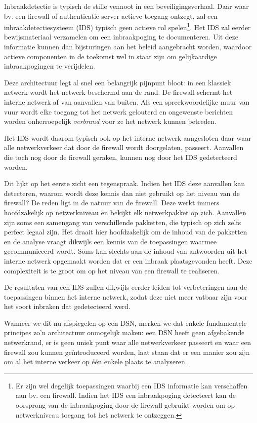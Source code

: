 Inbraakdetectie is typisch de stille vennoot in een beveiligingsverhaal. Daar
waar bv. een firewall of authenticatie server actieve toegang ontzegt, zal een
inbraakdetectiesysteem (IDS) typisch geen actieve rol spelen\footnote{Er zijn
wel degelijk toepassingen waarbij een IDS informatie kan verschaffen aan bv.
een firewall. Indien het IDS een inbraakpoging detecteert kan de oorsprong van
de inbraakpoging door de firewall gebruikt worden om op netwerkniveau toegang
tot het netwerk te ontzeggen.}. Het IDS zal eerder bewijsmateriaal verzamelen
om een inbraakpoging te documenteren. Uit deze informatie kunnen dan
bijsturingen aan het beleid aangebracht worden, waardoor actieve componenten in
de toekomst wel in staat zijn om gelijkaardige inbraakpogingen te verijdelen.

Deze architectuur legt al snel een belangrijk pijnpunt bloot: in een klassiek
netwerk wordt het netwerk beschermd aan de rand. De firewall schermt het
interne netwerk af van aanvallen van buiten. Als een spreekwoordelijke muur van
vuur wordt elke toegang tot het netwerk gelouterd en ongewenste berichten
worden onherroepelijk \emph{verbrand} voor ze het netwerk kunnen betreden.

Het IDS wordt daarom typisch ook op het interne netwerk aangesloten daar waar
alle netwerkverkeer dat door de firewall wordt doorgelaten, passeert. Aanvallen
die toch nog door de firewall geraken, kunnen nog door het IDS gedetecteerd
worden.

Dit lijkt op het eerste zicht een tegenspraak. Indien het IDS deze aanvallen
kan detecteren, waarom wordt deze kennis dan niet gebruikt op het niveau van de
firewall? De reden ligt in de natuur van de firewall. Deze werkt immers
hoofdzakelijk op netwerkniveau en bekijkt elk netwerkpakket op zich. Aanvallen
zijn soms een samengang van verschillende pakketten, die typisch op zich zelfs
perfect legaal zijn. Het draait hier hoofdzakelijk om de inhoud van de
pakketten en de analyse vraagt dikwijls een kennis van de toepassingen waarmee
gecommuniceerd wordt. Soms kan slechts aan de inhoud van antwoorden uit het
interne netwerk opgemaakt worden dat er een inbraak plaatsgevonden heeft. Deze
complexiteit is te groot om op het niveau van een firewall te realiseren.

De resultaten van een IDS zullen dikwijls eerder leiden tot verbeteringen aan
de toepassingen binnen het interne netwerk, zodat deze niet meer vatbaar zijn
voor het soort inbraken dat gedetecteerd werd.

Wanneer we dit nu afspiegelen op een DSN, merken we dat enkele fundamentele
principes zo'n architectuur onmogelijk maken: een DSN heeft geen afgebakende
netwerkrand, er is geen uniek punt waar alle netwerkverkeer passeert en waar
een firewall zou kunnen ge\"introduceerd worden, laat staan dat er een manier
zou zijn om al het interne verkeer op \'e\'en enkele plaats te analyseren.


